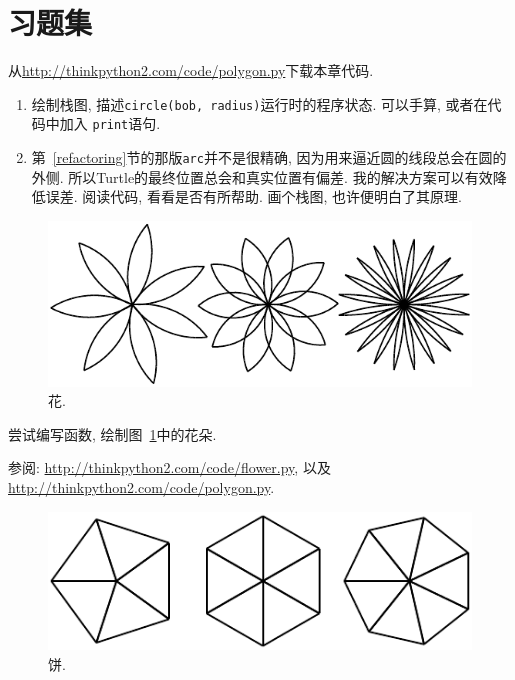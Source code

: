 \documentclass[10pt]{book}
\begin{document}
\section{习题集}

\begin{exercise}

从\url{http://thinkpython2.com/code/polygon.py}下载本章代码. 

\begin{enumerate}

\item 绘制栈图, 描述{\tt circle(bob, radius)}运行时的程序状态. 
可以手算, 或者在代码中加入 {\tt print}语句.

\item 第~\ref{refactoring}节的那版{\tt arc}并不是很精确, 
因为用来逼近圆的线段总会在圆的外侧. 
所以Turtle的最终位置总会和真实位置有偏差. 
我的解决方案可以有效降低误差. 阅读代码, 看看是否有所帮助. 
画个栈图, 也许便明白了其原理. 

\end{enumerate}

\end{exercise}

\begin{figure}
\centerline
{\includegraphics[scale=0.8]{figs/flowers.pdf}}
\caption{花.}
\label{fig.flowers}
\end{figure}

\begin{exercise}

尝试编写函数, 绘制图~\ref{fig.flowers}中的花朵. 

参阅: \url{http://thinkpython2.com/code/flower.py},
以及 \url{http://thinkpython2.com/code/polygon.py}.

\end{exercise}

\begin{figure}
\centerline
{\includegraphics[scale=0.8]{figs/pies.pdf}}
\caption{饼.}
\label{fig.pies}
\end{figure}
\end{document}
